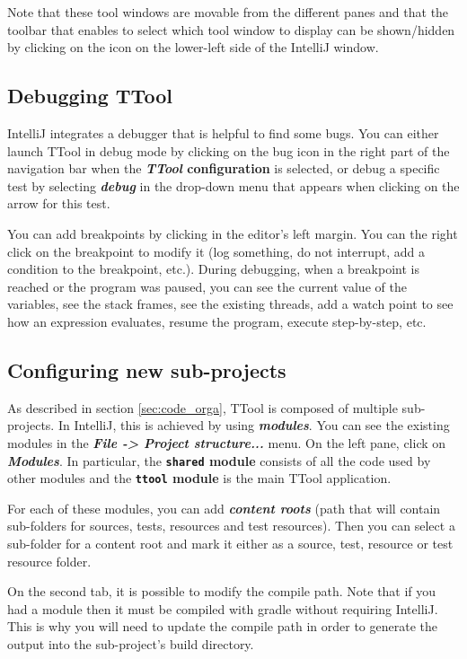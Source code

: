 \documentclass[12pt]{article}
\begin{document}
Note that these tool windows are movable from the different panes and that the
toolbar that enables to select which tool window to display can be shown/hidden
by clicking on the icon on the lower-left side of the IntelliJ window.

\subsection{Debugging TTool}

IntelliJ integrates a debugger that is helpful to find some bugs. You can either
launch TTool in debug mode by clicking on the bug icon in the right part of the
navigation bar when the \textbf{\emph{TTool} configuration} is selected, or debug a
specific test by selecting \textbf{\emph{debug}} in the drop-down menu that appears when
clicking on the arrow for this test.

You can add breakpoints by clicking in the editor's left margin. You can the
right click on the breakpoint to modify it (log something, do not interrupt, add
a condition to the breakpoint, etc.). During debugging, when a breakpoint is
reached or the program was paused, you can see the current value of the
variables, see the stack frames, see the existing threads, add a watch point to
see how an expression evaluates, resume the program, execute step-by-step, etc.

\subsection{Configuring new sub-projects}
\label{sec:intellij:subprojects}

As described in section \ref{sec:code_orga}, TTool is composed of multiple
sub-projects. In IntelliJ, this is achieved by using \textbf{\emph{modules}}. You can see
the existing modules in the \textbf{\emph{File -> Project structure...}} menu. On the
left pane, click on \textbf{\emph{Modules}}. In particular, the \textbf{\texttt{shared} module }
consists of all the code used by other modules and the \textbf{\texttt{ttool} module} is
the main TTool application.

For each of these modules, you can add \textbf{\emph{content roots}} (path that will
contain sub-folders for sources, tests, resources and test resources). Then you
can select a sub-folder for a content root and mark it either as a source, test,
resource or test resource folder.

On the second tab, it is possible to modify the compile path. Note that if you
had a module then it must be compiled with gradle without requiring IntelliJ.
This is why you will need to update the compile path in order to generate the
output into the sub-project's build directory.
\end{document}

